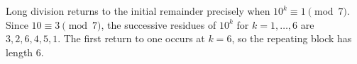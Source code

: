 Long division returns to the initial remainder precisely when $10^k\equiv1\pmod7$. Since $10\equiv3\pmod7$, the successive residues of $10^k$ for $k=1,\ldots,6$ are $3,2,6,4,5,1$. The first return to one occurs at $k=6$, so the repeating block has length $\boxed6$.
